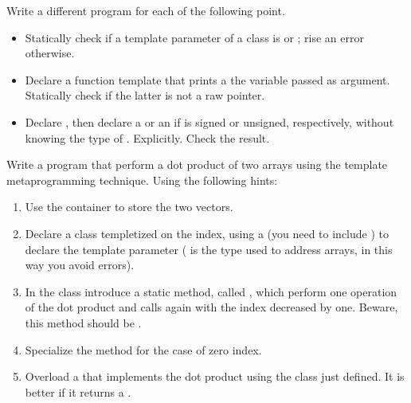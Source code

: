 Write a different program for each of the following point.
\begin{itemize}

    \item Statically check if a template parameter of a class is  or
    ; rise an error otherwise.

    \item Declare a function template that prints a the variable passed as argument. Statically check
    if the latter is not a raw pointer.

    \item Declare , then declare a  or an 
    if  is signed or unsigned, respectively, without knowing the type of .
    Explicitly. Check the result.

\end{itemize}

Write a program that perform a dot product of two arrays using the template metaprogramming
technique. Using the following hints:

\begin{enumerate}

    \item Use the container  to store the two vectors.

    \item Declare a class templetized on the index, using a
     (you need to include ) to declare the template parameter (
    is the type used to address arrays, in this way you avoid errors).

    \item In the class introduce a static method, called , which
    perform one operation of the dot product and calls again  with the
    index decreased by one. Beware, this method should be .

    \item Specialize the method  for the case of zero index.

    \item Overload a  that implements the dot product using the class just defined.
    It is better if it returns a .

\end{enumerate}
